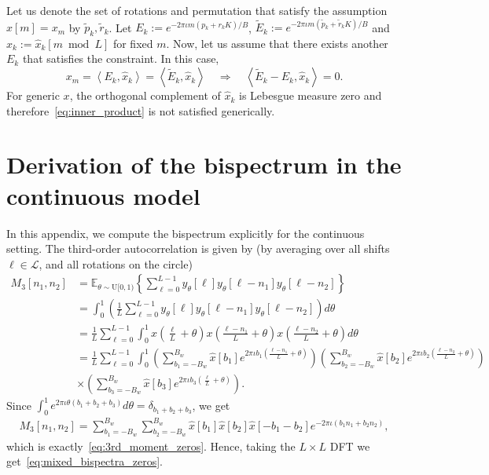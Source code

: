 \documentclass[english,12pt]{article}
\newcommand{\I}{\iota}
\newcommand{\tB}{B_w}
\newcommand{\hx}{\hat{x}}
\newcommand{\E}{\mathbb{E}}
\numberwithin{equation}{section}
\numberwithin{thm}{section} %
\begin{document}
Let us denote the set of rotations and permutation that satisfy the assumption  $\hx[m]=x_m$ by $\tilde{p}_k,\tilde{r}_k$. Let $E_k:=e^{-2\pi\I m( p_k+r_k K)/B}$, $\tilde{E}_k:=e^{-2\pi\I m( \tilde{p}_k+\tilde{r}_k K)/B}$ and $\hx_k:=\hat{x}_k[m \bmod L]$ for fixed $m$. Now, let us assume that there exists another $E_k$ that satisfies the constraint. In this case,
\begin{equation} \label{eq:inner_product}
x_m=\left\langle E_k,\hx_k\right\rangle = \left\langle \tilde{E}_k,\hx_k\right\rangle \quad \Rightarrow \quad\left\langle \tilde{E}_k -{E}_k,\hx_k\right\rangle =0.
\end{equation} 
For generic $x$, the orthogonal complement of $\hx_k$ is Lebesgue measure zero and therefore~\eqref{eq:inner_product} is not satisfied generically.  

\section{Derivation of the bispectrum in the continuous model} \label{sec:continuous_bispectrum}

In this appendix, we compute the bispectrum explicitly for the continuous setting. The third-order autocorrelation is given by (by averaging over all shifts $\ell\in\mathcal{L}$, and all rotations on the circle)
\begin{equation}
\begin{split}
M_3[n_1,n_2] &= \E_{\theta\sim\text{U}[0,1)}\left\{ \sum_{\ell=0}^{L-1}  y_\theta[\ell] y_\theta[\ell-n_1] y_\theta[\ell-n_2]\right\} 
\\&=\int_{0}^{1}\left(\frac{1}{L}\sum_{\ell=0}^{L-1} y_\theta[\ell] y_\theta[\ell-n_1] y_\theta[\ell-n_2]\right)d\theta\\ 
&= \frac{1}{L}\sum_{\ell=0}^{L-1}\int_{0}^{1} x\left(\frac{\ell}{L} + \theta\right) x\left(\frac{\ell-n_1}{L} + \theta\right)
x\left(\frac{\ell-n_2}{L} + \theta\right)d\theta\\
&= \frac{1}{L}\sum_{\ell=0}^{L-1}\int_{0}^{1} 
\left(\sum_{b_1=-\tB}^{\tB}\hat{x}[b_1]e^{2\pi\I b_1 \left(\frac{\ell-n_1}{L} + \theta\right) }\right) 
\left(\sum_{b_2=-\tB}^{\tB}\hat{x}[b_2]e^{2\pi\I b_2 \left(\frac{\ell-n_2}{L} + \theta\right) } \right) \\
&\times \left(\sum_{b_3=-\tB}^{\tB}\hat{x}[b_3]e^{2\pi\I b_3 \left(\frac{\ell}{L} + \theta\right) }\right). 
\end{split}
\end{equation}
Since $\int_{0}^{1}e^{2\pi\I\theta(b_1+b_2+b_3)}d\theta=\delta_{b_1+b_2+b_3}$, we get 
\begin{equation}
\begin{split}
M_3[n_1,n_2] =   \sum_{b_1=-\tB}^{\tB}\sum_{b_2=-\tB}^{\tB} \hat{x}[b_1]\hat{x}[b_2]\hat{x}[-b_1-b_2]e^{-2\pi\I (b_1n_1+b_2n_2)},
\end{split}
\end{equation}
which is exactly~\eqref{eq:3rd_moment_zeros}. Hence, taking the $L\times L$ DFT we get~\eqref{eq:mixed_bispectra_zeros}.
\end{document}
